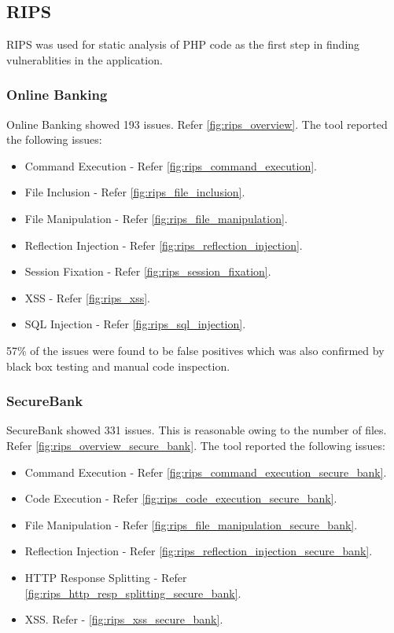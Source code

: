 \subsection{RIPS}
RIPS was used for static analysis of PHP code as the first step in finding vulnerablities in the application.
\subsubsection{Online Banking }
Online Banking showed 193 issues. Refer \ref{fig:rips_overview}. The tool reported the following issues:
\begin{itemize}
    \item Command Execution - Refer \ref{fig:rips_command_execution}.
    \item File Inclusion - Refer \ref{fig:rips_file_inclusion}.
    \item File Manipulation - Refer \ref{fig:rips_file_manipulation}.
    \item Reflection Injection - Refer \ref{fig:rips_reflection_injection}.
    \item Session Fixation - Refer \ref{fig:rips_session_fixation}.
    \item XSS - Refer \ref{fig:rips_xss}.
    \item SQL Injection - Refer \ref{fig:rips_sql_injection}.
\end{itemize}
57\% of the issues were found to be false positives which was also confirmed by black box testing and manual code inspection.

\subsubsection{SecureBank}
SecureBank showed 331 issues. This is reasonable owing to the number of files. Refer \ref{fig:rips_overview_secure_bank}. The tool reported the following issues:
\begin{itemize}
    \item Command Execution - Refer \ref{fig:rips_command_execution_secure_bank}.
    \item Code Execution - Refer \ref{fig:rips_code_execution_secure_bank}.
    \item File Manipulation - Refer \ref{fig:rips_file_manipulation_secure_bank}.
    \item Reflection Injection - Refer \ref{fig:rips_reflection_injection_secure_bank}.
    \item HTTP Response Splitting - Refer \ref{fig:rips_http_resp_splitting_secure_bank}.
    \item XSS. Refer - \ref{fig:rips_xss_secure_bank}.
\end{itemize}

